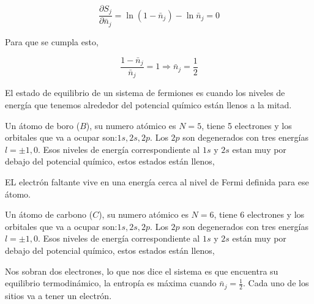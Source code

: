 \documentclass[11pt,fleqn]{book}
\begin{document}
\begin{equation}
    \frac{\partial S_{j}}{\partial\bar{n}_{j}}=\ln{(1-\bar{n}_{j})}-\ln{\bar{n}_{j}}=0
\end{equation}

Para que se cumpla esto,

\begin{equation*}
    \frac{1-\bar{n}_{j}}{\bar{n}_{j}}=1\Longrightarrow\bar{n}_{j}=\frac{1}{2}
\end{equation*}

El estado de equilibrio de un sistema de fermiones es cuando los niveles de energía que tenemos alrededor del potencial químico están llenos a la mitad.

\begin{example}

Un átomo de boro ($B$), su numero atómico es $N=5$, tiene 5 electrones y los orbitales que va a ocupar son:$1s, 2s, 2p$. Los $2p$ son degenerados con tres energías $l=\pm1, 0$. Esos niveles de energía correspondiente al $1s$ y $2s$ estan muy por debajo del potencial químico, estos estados están llenos, 


EL electrón faltante vive en una energía cerca al nivel de Fermi definida para ese átomo.\\
\end{example}

\begin{example}

Un átomo de carbono ($C$), su numero atómico es $N=6$, tiene 6 electrones y los orbitales que va a ocupar son:$1s, 2s, 2p$. Los $2p$ son degenerados con tres energías $l=\pm1, 0$. Esos niveles de energía correspondiente al $1s$ y $2s$ están muy por debajo del potencial químico, estos estados están llenos, 


Nos sobran dos electrones, lo que nos dice el sistema es que encuentra su equilibrio termodinámico, la entropía es máxima cuando $\bar{n}_{j}=\frac{1}{2}$. Cada uno de los sitios va a tener un electrón. \\
\end{example}
\end{document}
